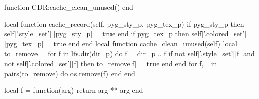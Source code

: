 \def\CDR@Debug { \typeout }
\makeatother
\ExplSyntaxOff

\begin{luacode}

function CDR:cache_clean_unused()
end

local function cache_record(self, pyg_sty_p, pyg_tex_p)
  if pyg_sty_p then
    self['.style_set']  [pyg_sty_p] = true
  end
  if pyg_tex_p then
    self['.colored_set'][pyg_tex_p] = true
  end
end
local function cache_clean_unused(self)
  local to_remove = {}
  for f in lfs.dir(dir_p) do
    f = dir_p .. f
    if not self['.style_set'][f] and not self['.colored_set'][f] then
      to_remove[f] = true
    end
  end
  for f,_ in pairs(to_remove) do
    os.remove(f)
  end
end

\end{luacode}


%
\begin{CDRBlock}[%
  tags=,
  fontfamily=menlo,
  fontsize=\Large,
  pygments=false,
  lang=lua,
  numbers=left,
  frame=lines,
  format=\color{green},
  debug=true,
  showspaces
]
local f = function(arg)
  return arg ** arg
end
\end{CDRBlock}

\endinput




\typeout {IN PROGRESSSSSSSSSSSSSSSSSSSSSSSSSSSSSSSSSSSSSSSSSSSSSS}
Next should not be void
\CDRSet{cache=false}
\begin{CDRBlock}[
  tags=,
  fontfamily=menlo,
  fontsize=\large,
  pygments=true,
  lang=python,
  numbers=left,
  frame=single,
  debug=true,
]
def foo(arg):
  return arg ** arg
\end{CDRBlock}

Next should not be void
\CDRSet{cache=false}
\begin{CDRBlock}[
  tags=,
  fontfamily=menlo,
  fontsize=\large,
  pygments=true,
  lang=lua,
  numbers=left,
  frame=lines,
  debug=true,
  frame=single,
  framerule=1mm,
  framesep=3mm,
  rulecolor=\color{red},
  fillcolor=\color{yellow},
  showspaces,
  baselinestretch=1.75
]
function foo(arg)
  return arg ** arg
end
\end{CDRBlock}

\egroup

\subsection{Line numbering}

\bgroup


